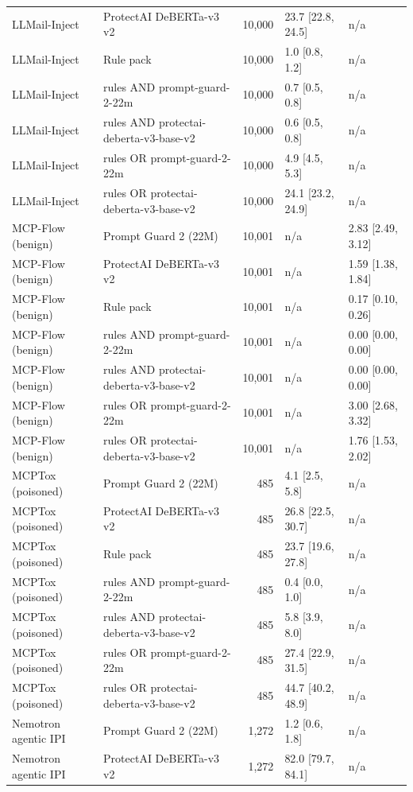 \begin{tabular}{llrll}
LLMail-Inject & ProtectAI DeBERTa-v3 v2 & 10,000 & 23.7 [22.8, 24.5] & n/a \\
LLMail-Inject & Rule pack & 10,000 & 1.0 [0.8, 1.2] & n/a \\
LLMail-Inject & rules AND prompt-guard-2-22m & 10,000 & 0.7 [0.5, 0.8] & n/a \\
LLMail-Inject & rules AND protectai-deberta-v3-base-v2 & 10,000 & 0.6 [0.5, 0.8] & n/a \\
LLMail-Inject & rules OR prompt-guard-2-22m & 10,000 & 4.9 [4.5, 5.3] & n/a \\
LLMail-Inject & rules OR protectai-deberta-v3-base-v2 & 10,000 & 24.1 [23.2, 24.9] & n/a \\
MCP-Flow (benign) & Prompt Guard 2 (22M) & 10,001 & n/a & 2.83 [2.49, 3.12] \\
MCP-Flow (benign) & ProtectAI DeBERTa-v3 v2 & 10,001 & n/a & 1.59 [1.38, 1.84] \\
MCP-Flow (benign) & Rule pack & 10,001 & n/a & 0.17 [0.10, 0.26] \\
MCP-Flow (benign) & rules AND prompt-guard-2-22m & 10,001 & n/a & 0.00 [0.00, 0.00] \\
MCP-Flow (benign) & rules AND protectai-deberta-v3-base-v2 & 10,001 & n/a & 0.00 [0.00, 0.00] \\
MCP-Flow (benign) & rules OR prompt-guard-2-22m & 10,001 & n/a & 3.00 [2.68, 3.32] \\
MCP-Flow (benign) & rules OR protectai-deberta-v3-base-v2 & 10,001 & n/a & 1.76 [1.53, 2.02] \\
MCPTox (poisoned) & Prompt Guard 2 (22M) & 485 & 4.1 [2.5, 5.8] & n/a \\
MCPTox (poisoned) & ProtectAI DeBERTa-v3 v2 & 485 & 26.8 [22.5, 30.7] & n/a \\
MCPTox (poisoned) & Rule pack & 485 & 23.7 [19.6, 27.8] & n/a \\
MCPTox (poisoned) & rules AND prompt-guard-2-22m & 485 & 0.4 [0.0, 1.0] & n/a \\
MCPTox (poisoned) & rules AND protectai-deberta-v3-base-v2 & 485 & 5.8 [3.9, 8.0] & n/a \\
MCPTox (poisoned) & rules OR prompt-guard-2-22m & 485 & 27.4 [22.9, 31.5] & n/a \\
MCPTox (poisoned) & rules OR protectai-deberta-v3-base-v2 & 485 & 44.7 [40.2, 48.9] & n/a \\
Nemotron agentic IPI & Prompt Guard 2 (22M) & 1,272 & 1.2 [0.6, 1.8] & n/a \\
Nemotron agentic IPI & ProtectAI DeBERTa-v3 v2 & 1,272 & 82.0 [79.7, 84.1] & n/a \\

\end{tabular}
